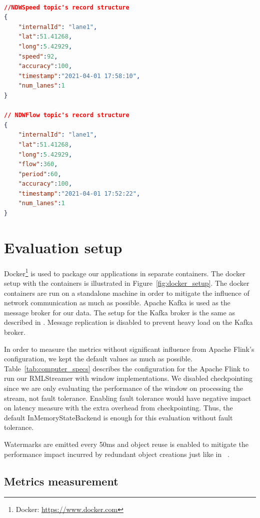 \begin{lstlisting}[language=JSON, 
caption={JSON data structure of the records.}, 
label={lst:record_json_structure} ]

//NDWSpeed topic's record structure
{
    "internalId": "lane1", 
    "lat":51.41268,
    "long":5.42929,
    "speed":92,
    "accuracy":100,
    "timestamp":"2021-04-01 17:58:10",
    "num_lanes":1
}

// NDWFlow topic's record structure
{
    "internalId": "lane1", 
    "lat":51.41268,
    "long":5.42929,
    "flow":360,
    "period":60,
    "accuracy":100,
    "timestamp":"2021-04-01 17:52:22",
    "num_lanes":1
}
\end{lstlisting}




\section{Evaluation setup}

Docker\footnote{Docker: \url{https://www.docker.com}} is used to package 
our applications in separate containers. The docker setup with the containers 
is illustrated in Figure~\ref{fig:docker_setup}. The docker containers 
are run on a standalone machine in order to mitigate the influence of 
network communication as much as possible. Apache Kafka is used 
as the message broker for our data. The setup for the Kafka broker is 
the same as described in \cite{evalution_of_spe}. Message replication 
is disabled to prevent heavy load on the Kafka broker. 

In order to measure the metrics without significant influence from  
Apache Flink's configuration, we kept the default values as much as possible. 
Table~\ref{tab:computer_specs} describes the configuration for the 
Apache Flink to run our RMLStreamer with window implementations. We 
disabled checkpointing since we are only evaluating the performance of 
the window on processing the stream, not fault tolerance. Enabling 
fault tolerance would have negative impact on latency measure 
with the extra overhead from checkpointing. Thus, the 
default InMemoryStateBackend is enough for this evaluation without 
fault tolerance.

Watermarks are emitted every 50ms and object reuse is enabled to 
mitigate the performance impact incurred by redundant object creations just 
like in ~\cite{evalution_of_spe}. 

\subsection{Metrics measurement}%
\label{sub:Metrics measurement}

